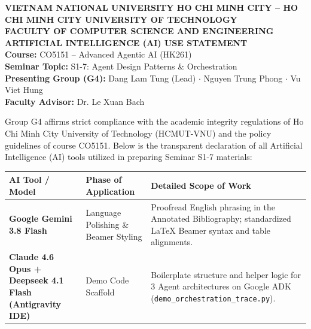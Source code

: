 \documentclass[11pt,a4paper]{article}
\begin{document}
\begin{center}
  {\small \textbf{VIETNAM NATIONAL UNIVERSITY HO CHI MINH CITY -- HO CHI MINH CITY UNIVERSITY OF TECHNOLOGY}}\\[0.05cm]
  {\small \textbf{FACULTY OF COMPUTER SCIENCE AND ENGINEERING}}\\[0.1cm]
  {\large\bfseries\color{hcmutblue} ARTIFICIAL INTELLIGENCE (AI) USE STATEMENT}\\[0.2cm]
  {\normalsize \textbf{Course:} CO5151 -- Advanced Agentic AI (HK261)}\\
  {\normalsize \textbf{Seminar Topic:} S1-7: Agent Design Patterns \& Orchestration}\\
  {\normalsize \textbf{Presenting Group (G4):} Dang Lam Tung (Lead) $\cdot$ Nguyen Trung Phong $\cdot$ Vu Viet Hung}\\
  {\normalsize \textbf{Faculty Advisor:} Dr. Le Xuan Bach}
\end{center}

\vspace{0.4cm}
\noindent Group G4 affirms strict compliance with the academic integrity regulations of Ho Chi Minh City University of Technology (HCMUT-VNU) and the policy guidelines of course CO5151. Below is the transparent declaration of all Artificial Intelligence (AI) tools utilized in preparing Seminar S1-7 materials:

\vspace{0.3cm}
\begin{table}[h]
\centering
\small
\begin{tabular}{p{3.5cm}p{4.2cm}p{6.8cm}}
\toprule
\textbf{AI Tool / Model} & \textbf{Phase of Application} & \textbf{Detailed Scope of Work} \\
\midrule
\textbf{Google Gemini 3.8 Flash} & Language Polishing \& Beamer Styling & Proofread English phrasing in the Annotated Bibliography; standardized LaTeX Beamer syntax and table alignments. \\
\addlinespace
\textbf{Claude 4.6 Opus + Deepseek 4.1 Flash (Antigravity IDE)} & Demo Code Scaffold & Boilerplate structure and helper logic for 3 Agent architectures on Google ADK (\texttt{demo\_orchestration\_trace.py}). \\
\bottomrule
\end{tabular}
\end{table}
\end{document}
